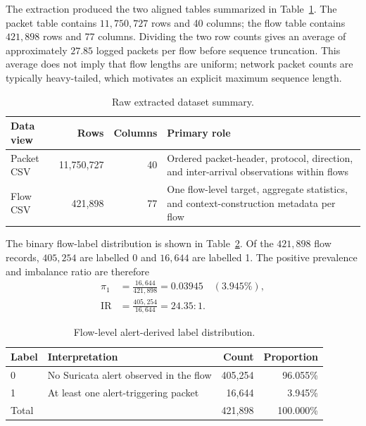 The extraction produced the two aligned tables summarized in
Table~\ref{tab:raw_dataset_summary}. The packet table contains
$11{,}750{,}727$ rows and 40 columns; the flow table contains $421{,}898$ rows
and 77 columns. Dividing the two row counts gives an average of approximately
$27.85$ logged packets per flow before sequence truncation. This average does
not imply that flow lengths are uniform; network packet counts are typically
heavy-tailed, which motivates an explicit maximum sequence length.

\begin{table}[t]
    \centering
    \caption{Raw extracted dataset summary.}
    \label{tab:raw_dataset_summary}
    \begin{tabular}{@{}lrrp{5.7cm}@{}}
        \toprule
        Data view & Rows & Columns & Primary role \\
        \midrule
        Packet CSV & 11,750,727 & 40 & Ordered packet-header, protocol,
        direction, and inter-arrival observations within flows \\
        Flow CSV & 421,898 & 77 & One flow-level target, aggregate
        statistics, and context-construction metadata per flow \\
        \bottomrule
    \end{tabular}
\end{table}

The binary flow-label distribution is shown in
Table~\ref{tab:flow_label_distribution}. Of the $421{,}898$ flow records,
$405{,}254$ are labelled 0 and $16{,}644$ are labelled 1. The positive
prevalence and imbalance ratio are therefore
\begin{align}
    \pi_1 &= \frac{16{,}644}{421{,}898} = 0.03945
             \quad (3.945\%), \\
    \mathrm{IR} &= \frac{405{,}254}{16{,}644} = 24.35:1.
    \label{eq:dataset_imbalance}
\end{align}

\begin{table}[t]
    \centering
    \caption{Flow-level alert-derived label distribution.}
    \label{tab:flow_label_distribution}
    \begin{tabular}{@{}llrr@{}}
        \toprule
        Label & Interpretation & Count & Proportion \\
        \midrule
        0 & No Suricata alert observed in the flow & 405,254 & 96.055\% \\
        1 & At least one alert-triggering packet & 16,644 & 3.945\% \\
        \midrule
        Total & & 421,898 & 100.000\% \\
        \bottomrule
    \end{tabular}
\end{table}


